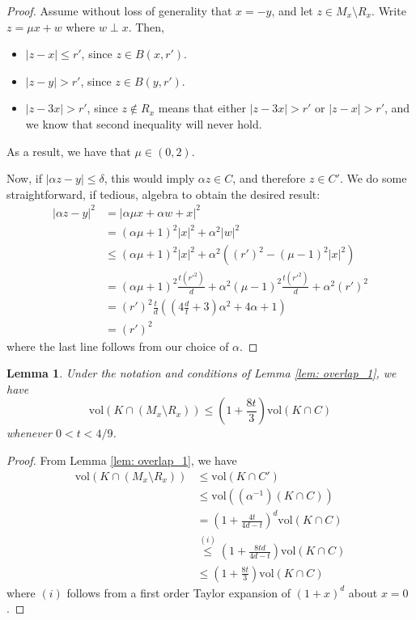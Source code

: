 \documentclass{article}
\newcommand{\abs}[1]{\left \lvert #1 \right \rvert}
\newcommand{\vol}{\mathrm{vol}}
\newcommand{\1}{\mathbf{1}}
\theoremstyle{alden}
\theoremstyle{aldenthm}
\newtheorem{lemma}{Lemma}
\theoremstyle{remark}
\begin{document}
\begin{proof}
	Assume without loss of generality that $x = -y$, and let $z \in M_x \setminus R_x$. Write $z = \mu x + w$ where $w \perp x$. Then,
	\begin{itemize}
		\item $\abs{z - x} \leq r'$, since $z \in B(x,r')$.
		\item $\abs{z - y} > r'$, since $z \in B(y,r')$.
		\item $\abs{z - 3x} > r'$, since $z \not\in R_x$ means that either $\abs{z - 3x} > r'$ or $\abs{z - x} > r'$, and we know that second inequality will never hold.
	\end{itemize}
	As a result, we have that $\mu \in (0,2)$.
	
	Now, if $\abs{\alpha z - y} \leq \delta$, this would imply $\alpha z \in C$, and therefore $z \in C'$. We do some straightforward, if tedious, algebra to obtain the desired result:
	\begin{align*}
	\abs{\alpha z - y}^2 & = \abs{\alpha \mu x + \alpha w + x}^2 \\
	& = (\alpha \mu + 1)^2\abs{x}^2 + \alpha^2 \abs{w}^2 \\
	& \leq (\alpha \mu + 1)^2\abs{x}^2 + \alpha^2 ((r')^2 - (\mu - 1)^2 \abs{x}^2) \\
	& = (\alpha \mu + 1)^2 \frac{t(r'^2)}{d} + \alpha^2(\mu - 1)^2 \frac{t(r'^2)}{d} + \alpha^2 (r')^2 \\
	& = (r')^2 \frac{t}{d}\left((4\frac{d}{t} + 3)\alpha^2 + 4 \alpha + 1 \right) \\
	& = (r')^2
	\end{align*}
	where the last line follows from our choice of $\alpha$. 
\end{proof}

\begin{lemma}
	\label{lem: overlap_2}
	Under the notation and conditions of Lemma \ref{lem: overlap_1}, we have
	\begin{equation*}
	\vol(K \cap (M_x \setminus R_x)) \leq (1 + \frac{8t}{3}) \vol(K \cap C)
	\end{equation*}
	whenever $0 < t < 4/9$.
\end{lemma}
\begin{proof}
	From Lemma \ref{lem: overlap_1}, we have
	\begin{align*}
	\vol(K \cap (M_x \setminus R_x)) & \leq \vol(K \cap C') \\
	& \leq \vol((\alpha^{-1})(K \cap C)) \\
	& = (1 + \frac{4t}{4d - t})^d \vol(K \cap C) \\
	& \overset{(i)}{\leq} \left(1 + \frac{8td}{4d - t} \right) \vol(K \cap C) \\
	& \leq (1 + \frac{8t}{3}) \vol(K \cap C)
	\end{align*}
	where $(i)$ follows from a first order Taylor expansion of $(1 + x)^d$ about $x = 0$. 
\end{proof}
\end{document}
